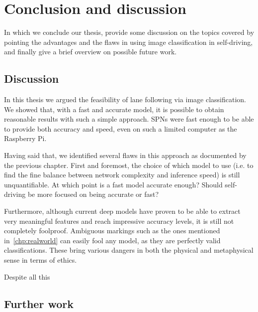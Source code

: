 
\chapter{Conclusion and discussion}\label{chp:conclusions}

In which we conclude our thesis, provide some discussion on the topics covered by pointing the
advantages and the flaws in using image classification in self-driving, and finally give a brief
overview on possible future work.

\section{Discussion}

In this thesis we argued the feasibility of lane following via image classification. We showed
that, with a fast and accurate model, it is possible to obtain reasonable results with such a
simple approach. SPNs were fast enough to be able to provide both accuracy and speed, even on such
a limited computer as the Raspberry Pi.

Having said that, we identified several flaws in this approach as documented by the previous
chapter. First and foremost, the choice of which model to use (i.e. to find the fine balance
between network complexity and inference speed) is still unquantifiable. At which point is a fast
model accurate enough? Should self-driving be more focused on being accurate or fast?

Furthermore, although current deep models have proven to be able to extract very meaningful
features and reach impressive accuracy levels, it is still not completely foolproof. Ambiguous
markings such as the ones mentioned in~\autoref{chp:realworld} can easily fool any model, as they
are perfectly valid classifications. These bring various dangers in both the physical and
metaphysical sense in terms of ethics.

Despite all this

\section{Further work}
